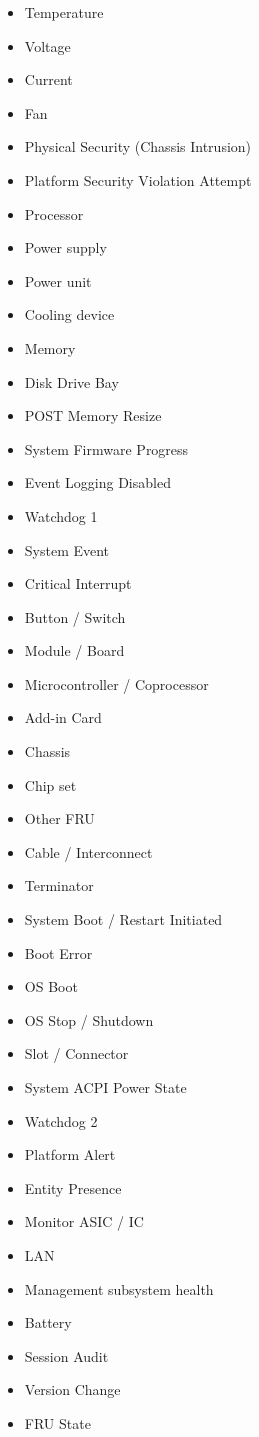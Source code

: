 \documentclass{article}
\begin{document}
\begin{itemize}
  \item Temperature
  \item Voltage
  \item Current
  \item Fan
  \item Physical Security (Chassis Intrusion)
  \item Platform Security Violation Attempt
  \item Processor
  \item Power supply
  \item Power unit
  \item Cooling device
  \item Memory
  \item Disk Drive Bay
  \item POST Memory Resize
  \item System Firmware Progress
  \item Event Logging Disabled
  \item Watchdog 1
  \item System Event
  \item Critical Interrupt
  \item Button / Switch
  \item Module / Board
  \item Microcontroller / Coprocessor
  \item Add-in Card
  \item Chassis
  \item Chip set
  \item Other FRU
  \item Cable / Interconnect
  \item Terminator
  \item System Boot / Restart Initiated
  \item Boot Error
  \item OS Boot
  \item OS Stop / Shutdown
  \item Slot / Connector
  \item System ACPI Power State
  \item Watchdog 2
  \item Platform Alert
  \item Entity Presence
  \item Monitor ASIC / IC
  \item LAN
  \item Management subsystem health
  \item Battery
  \item Session Audit
  \item Version Change
  \item FRU State
  
\end{itemize}
\end{document}
